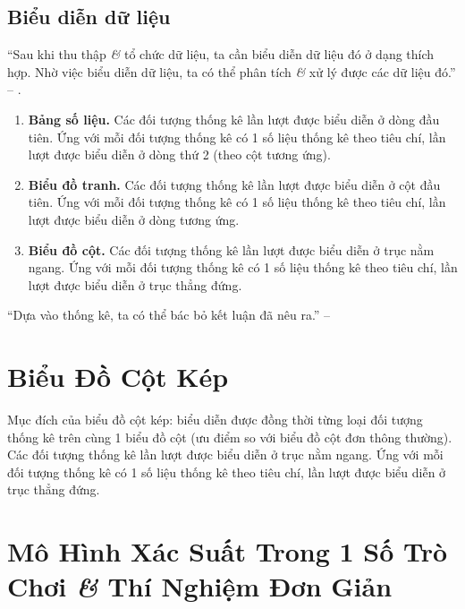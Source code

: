 \documentclass[oneside]{book}
\numberwithin{equation}{section}
\begin{document}
\subsection{Biểu diễn dữ liệu}
``Sau khi thu thập \textit{\&} tổ chức dữ liệu, ta cần biểu diễn dữ liệu đó ở dạng thích hợp. Nhờ việc biểu diễn dữ liệu, ta có thể phân tích \textit{\&} xử lý được các dữ liệu đó.'' -- \cite[p. 6]{Thai_Anh_Dat_Ha_Loan_Nam_Quang_Toan_6_tap_2}.
\begin{enumerate}
	\item \textbf{Bảng số liệu.} Các đối tượng thống kê lần lượt được biểu diễn ở dòng đầu tiên. Ứng với mỗi đối tượng thống kê có 1 số liệu thống kê theo tiêu chí, lần lượt được biểu diễn ở dòng thứ 2 (theo cột tương ứng).
	\item \textbf{Biểu đồ tranh.} Các đối tượng thống kê lần lượt được biểu diễn ở cột đầu tiên. Ứng với mỗi đối tượng thống kê có 1 số liệu thống kê theo tiêu chí, lần lượt được biểu diễn ở dòng tương ứng.
	\item \textbf{Biểu đồ cột.} Các đối tượng thống kê lần lượt được biểu diễn ở trục nằm ngang. Ứng với mỗi đối tượng thống kê có 1 số liệu thống kê theo tiêu chí, lần lượt được biểu diễn ở trục thẳng đứng.
\end{enumerate}
``Dựa vào thống kê, ta có thể bác bỏ kết luận đã nêu ra.'' -- \cite[p. 8]{Thai_Anh_Dat_Ha_Loan_Nam_Quang_Toan_6_tap_2}


\section{Biểu Đồ Cột Kép}
Mục đích của biểu đồ cột kép: biểu diễn được đồng thời từng loại đối tượng thống kê trên cùng 1 biểu đồ cột (ưu điểm so với biểu đồ cột đơn thông thường). Các đối tượng thống kê lần lượt được biểu diễn ở trục nằm ngang. Ứng với mỗi đối tượng thống kê có 1 số liệu thống kê theo tiêu chí, lần lượt được biểu diễn ở trục thẳng đứng.


\section{Mô Hình Xác Suất Trong 1 Số Trò Chơi \textit{\&} Thí Nghiệm Đơn Giản}
\end{document}
